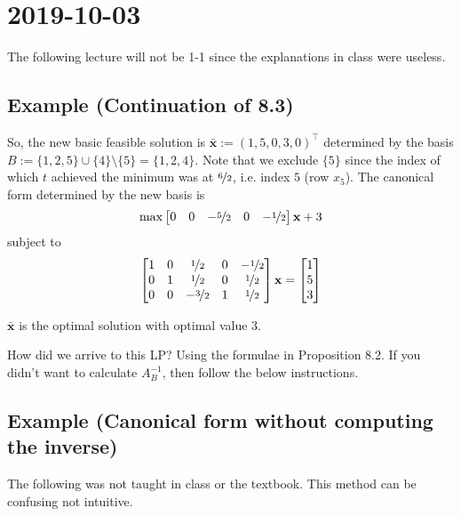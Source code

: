 \section{2019-10-03}
\begin{remark}
    The following lecture will not be 1-1 since the explanations in class were useless.
\end{remark}

\subsection{Example (Continuation of 8.3)}
So, the new basic feasible solution is $\mathbf{\bar{x}}:=(1,5,0,3,0)^\top$
determined by the basis $B:=\{1,2,5\}\cup\{4\}\setminus \{5\}=\{1,2,4\}$. Note that
we exclude $\{5\}$ since the index of which $t$ achieved the minimum was at
$\nicefrac{6}{2}$, i.e. index $5$ (row $x_5$). The canonical form determined by the new
basis is
\[\max \begin{bmatrix}
    0 & 0 & -\nicefrac{5}{2} & 0 & -\nicefrac{1}{2}
\end{bmatrix}\mathbf{x}+3\]
subject to
\[
    \begin{bmatrix}
        1 & 0 & \nicefrac{1}{2} & 0 & -\nicefrac{1}{2}\\
        0 & 1 & \nicefrac{1}{2} & 0 & \nicefrac{1}{2}\\
        0 & 0 & -\nicefrac{3}{2} & 1 & \nicefrac{1}{2}
    \end{bmatrix}\mathbf{x}
    =
    \begin{bmatrix}
        1\\
        5\\
        3
    \end{bmatrix}
\]
\begin{remark}
    $\mathbf{\bar{x}}$ is the optimal solution with optimal value $3$.
\end{remark}
\begin{remark}
    How did we arrive to this LP? Using the formulae in Proposition 8.2. If you didn't want to
    calculate $A_B^{-1}$, then follow the below instructions.
\end{remark}

\subsection{Example (Canonical form without computing the inverse)}
\begin{remark}
    The following was not taught in class or the textbook. 
    This method can be confusing not intuitive.
\end{remark}


